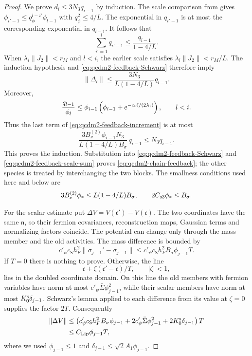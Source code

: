 \documentclass[11pt,letterpaper,reqno]{amsart}
\theoremstyle{definition}
\theoremstyle{remark}
\begin{document}
\begin{proof}
We prove $d_i\le3N_3q_{i-1}$ by induction.
The scale comparison from \cite[Prop. 10.1]{QCDM1}
gives $\phi_{i'-1}\le q_\phi^{l-i'}\phi_{l-1}$
with $q_\phi^2\le4/L$.  The exponential in $q_{i'-1}$
is at most the corresponding exponential in $q_{l-1}$.
It follows that
\begin{equation}\label{eq:qcdm2-feedback-scale-sum}
 \sum_{i'=1}^l q_{i'-1}\le\frac{q_{l-1}}{1-4/L}.
\end{equation}
When $\lambda_i\|J_2\|<r_M$ and $l<i$, the earlier
scale satisfies $\lambda_l\|J_2\|<r_M/L$.
The induction hypothesis and
\eqref{eq:qcdm2-feedback-Schwarz} therefore imply
\[
 \|\Delta_l\|\le
       \frac{3N_3}{L(1-4/L)}q_{l-1}.
\]
Moreover,
\[
 \frac{q_{l-1}}{\phi_l}
 \le\phi_{i-1}
       \left(\phi_{i-1}
             +e^{-c_{\rm t}\ell/(2\lambda_i)}\right),
 \qquad l<i.
\]
Thus the last term of
\eqref{eq:qcdm2-feedback-increment} is at most
\[
 \frac{3B_\nu^{(2)}\phi_{i-1}N_3}
      {L(1-4/L)B_\sigma}\,q_{i-1}
 \le N_3q_{i-1}.
\]
This proves the induction.  Substitution into
\eqref{eq:qcdm2-feedback-Schwarz} and
\eqref{eq:qcdm2-feedback-scale-sum} proves
\eqref{eq:qcdm2-chain-feedback}; the other species is
treated by interchanging the two blocks.
The smallness conditions used here and below are
\[
 3B_\nu^{(2)}\phi_*\le L(1-4/L)B_\sigma,
 \qquad 2C_{\rm s3}\phi_*\le B_\sigma.
\]

For the scalar estimate put
$\Delta V=V(\mathfrak c')-V(\mathfrak c)$.
The two coordinates have the same $\mathsf n$, so their
fermion covariances, reconstruction maps, Gaussian terms
and normalizing factors coincide.  The potential can
change only through the mass member and the old
activities.  The mass difference is bounded by
\[
 c'_\psi c_{\mathsf S}h_F^2
        \|\sigma_{j-1}'-\sigma_{j-1}\|
 \le c'_\psi c_{\mathsf S}h_F^2B_\sigma\phi_{j-1}T.
\]
If $T=0$ there is nothing to prove.  Otherwise, the line
\[
 \mathfrak c+\zeta(\mathfrak c'-\mathfrak c)/T,
 \qquad |\zeta|<1,
\]
lies in the doubled coordinate domain.  On this line
the old members with fermion variables have norm at most
$c'_\psi\bar\Sigma\phi_{j-1}^2$, while their scalar
members have norm at most $K_0^{\rm s}\delta_{j-1}$.
Schwarz's lemma applied to each difference from its value
at $\zeta=0$ supplies the factor $2T$.  Consequently
\begin{align*}
 \|\Delta V\|
 &\le\left(c'_\psi c_{\mathsf S}h_F^2B_\sigma\phi_{j-1}
       +2c'_\psi\bar\Sigma\phi_{j-1}^2
       +2K_0^{\rm s}\delta_{j-1}\right)T\\
 &\le C_{\rm Lip}\phi_{j-1}T,
\end{align*}
where we used $\phi_{j-1}\le1$ and
$\delta_{j-1}\le\sqrt2 A_1\phi_{j-1}$.


\end{proof}
\end{document}
